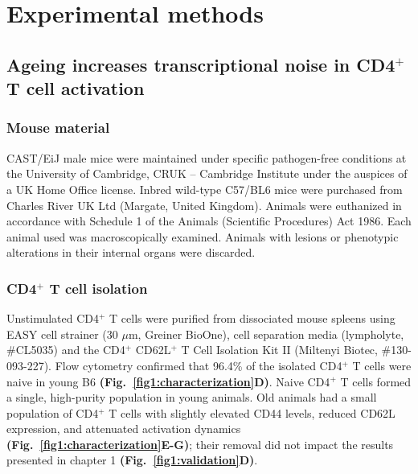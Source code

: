 
\chapter{Experimental methods} 

\section{Ageing increases transcriptional noise in CD4$^+$ T cell activation}
\label{appA.1}

\subsection{Mouse material}

CAST/EiJ male mice were maintained under specific pathogen-free conditions at the University of Cambridge, CRUK – Cambridge Institute under the auspices of a UK Home Office license. Inbred wild-type C57/BL6 mice were purchased from Charles River UK Ltd (Margate, United Kingdom). Animals were euthanized in accordance with Schedule 1 of the Animals (Scientific Procedures) Act 1986. Each animal used was macroscopically examined. Animals with lesions or phenotypic alterations in their internal organs were discarded. \\

\subsection{CD4$^+$ T cell isolation}
\label{appA.1:isolation}

Unstimulated CD4$^+$ T cells were purified from dissociated mouse spleens using EASY cell strainer (30 $\mu$m, Greiner BioOne), cell separation media (lympholyte, \#{}CL5035) and the CD4$^+$ CD62L$^+$ T Cell Isolation Kit II (Miltenyi Biotec, \#{}130-093-227). Flow cytometry confirmed that 96.4\% of the isolated CD4$^+$ T cells were naive in young B6 \textbf{(Fig.~\ref{fig1:characterization}D)}. Naive CD4$^+$ T cells formed a single, high-purity population in young animals. Old animals had a small population of CD4$^+$ T cells with slightly elevated CD44 levels, reduced CD62L expression, and attenuated activation dynamics \textbf{(Fig.~\ref{fig1:characterization}E-G)}; their removal did not impact the results presented in chapter 1 \textbf{(Fig.~\ref{fig1:validation}D)}.\\

